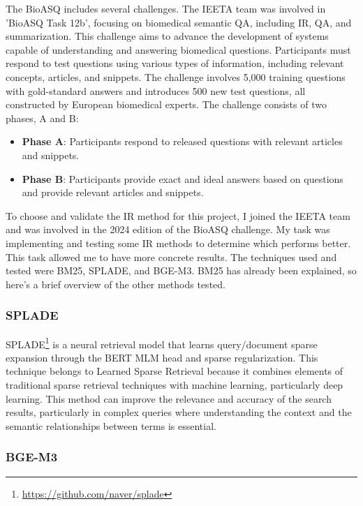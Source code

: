 The BioASQ includes several challenges. The IEETA team was involved in 'BioASQ Task 12b', focusing on biomedical semantic QA, including IR, QA, and summarization. This challenge aims to advance the development of systems capable of understanding and answering biomedical questions. Participants must respond to test questions using various types of information, including relevant concepts, articles, and snippets. The challenge involves 5,000 training questions with gold-standard answers and introduces 500 new test questions, all constructed by European biomedical experts. The challenge consists of two phases, A and B:

\begin{itemize}
    \item \textbf{Phase A}: Participants respond to released questions with relevant articles and snippets.
    \item \textbf{Phase B}: Participants provide exact and ideal answers based on questions and provide relevant articles and snippets.
\end{itemize}

To choose and validate the IR method for this project, I joined the IEETA team and was involved in the 2024 edition of the BioASQ challenge. My task was implementing and testing some IR methods to determine which performs better. This task allowed me to have more concrete results. The techniques used and tested were BM25, SPLADE, and BGE-M3. BM25 has already been explained, so here's a brief overview of the other methods tested.


\subsubsection{SPLADE} 

SPLADE\footnote{\url{https://github.com/naver/splade}} is a neural retrieval model that learns query/document sparse expansion through the BERT MLM head and sparse regularization. This technique belongs to Learned Sparse Retrieval because it combines elements of traditional sparse retrieval techniques with machine learning, particularly deep learning. This method can improve the relevance and accuracy of the search results, particularly in complex queries where understanding the context and the semantic relationships between terms is essential.


\subsubsection{BGE-M3}

